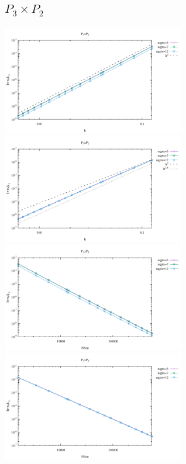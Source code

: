 \newpage
\subsection*{$P_3\times P_2$}
\begin{center}
\includegraphics[width=8cm]{python_codes/fieldstone_120/results/P3P2-velocity-h.pdf}
\includegraphics[width=8cm]{python_codes/fieldstone_120/results/P3P2-pressure-h.pdf}
\includegraphics[width=8cm]{python_codes/fieldstone_120/results/P3P2-velocity-Nfem.pdf}
\includegraphics[width=8cm]{python_codes/fieldstone_120/results/P3P2-pressure-Nfem.pdf}
\end{center}

